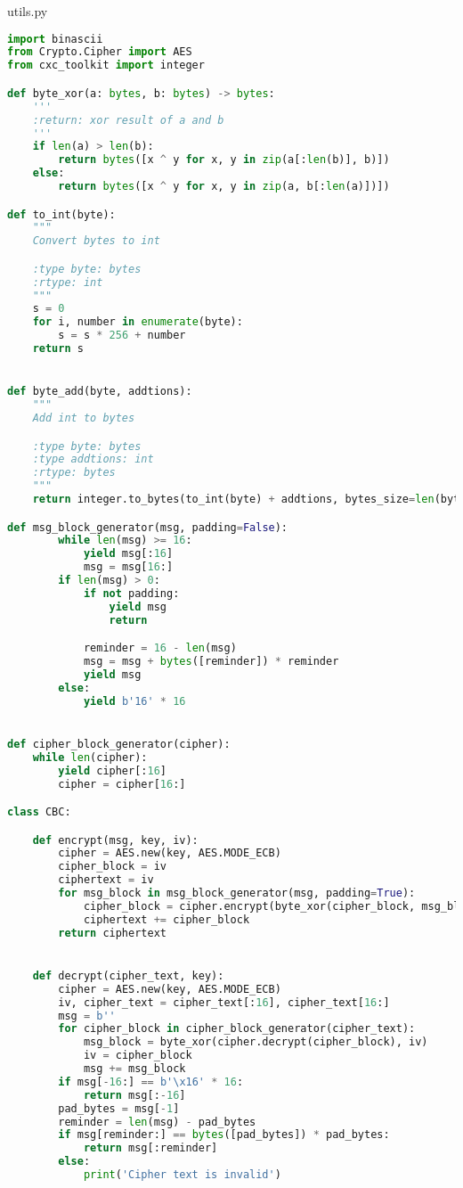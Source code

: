 utils.py
\begin{lstlisting}[language = Python]
import binascii
from Crypto.Cipher import AES
from cxc_toolkit import integer

def byte_xor(a: bytes, b: bytes) -> bytes:
    '''
    :return: xor result of a and b
    '''
    if len(a) > len(b):
        return bytes([x ^ y for x, y in zip(a[:len(b)], b)])
    else:
        return bytes([x ^ y for x, y in zip(a, b[:len(a)])])

def to_int(byte):
    """
    Convert bytes to int

    :type byte: bytes
    :rtype: int
    """
    s = 0
    for i, number in enumerate(byte):
        s = s * 256 + number
    return s


def byte_add(byte, addtions):
    """
    Add int to bytes

    :type byte: bytes
    :type addtions: int
    :rtype: bytes
    """
    return integer.to_bytes(to_int(byte) + addtions, bytes_size=len(byte))

def msg_block_generator(msg, padding=False):
        while len(msg) >= 16:
            yield msg[:16]
            msg = msg[16:]
        if len(msg) > 0:
            if not padding:
                yield msg
                return

            reminder = 16 - len(msg)
            msg = msg + bytes([reminder]) * reminder
            yield msg
        else:
            yield b'16' * 16


def cipher_block_generator(cipher):
    while len(cipher):
        yield cipher[:16]
        cipher = cipher[16:]

class CBC:

    def encrypt(msg, key, iv):
        cipher = AES.new(key, AES.MODE_ECB)
        cipher_block = iv
        ciphertext = iv
        for msg_block in msg_block_generator(msg, padding=True):
            cipher_block = cipher.encrypt(byte_xor(cipher_block, msg_block))
            ciphertext += cipher_block
        return ciphertext


    def decrypt(cipher_text, key):
        cipher = AES.new(key, AES.MODE_ECB)
        iv, cipher_text = cipher_text[:16], cipher_text[16:]
        msg = b''
        for cipher_block in cipher_block_generator(cipher_text):
            msg_block = byte_xor(cipher.decrypt(cipher_block), iv)
            iv = cipher_block
            msg += msg_block
        if msg[-16:] == b'\x16' * 16:
            return msg[:-16]
        pad_bytes = msg[-1]
        reminder = len(msg) - pad_bytes
        if msg[reminder:] == bytes([pad_bytes]) * pad_bytes:
            return msg[:reminder]
        else:
            print('Cipher text is invalid')



\end{lstlisting}

